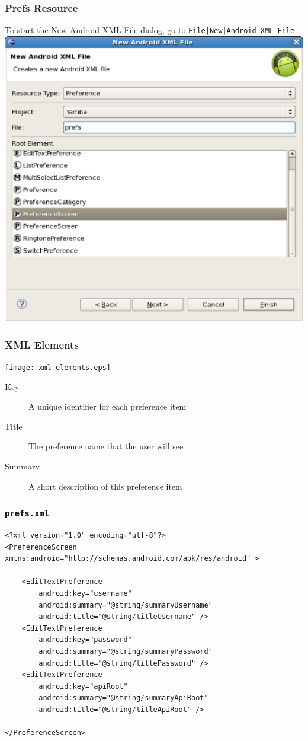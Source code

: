\begin{frame}
\frametitle{Prefs Resource}
To start the New Android XML File dialog, go to \texttt{File|New|Android XML File}
\centering
\includegraphics[width= 0.55 \textwidth]{newAndroidXMLFile.eps}
\end{frame}
\begin{frame}
\frametitle{XML Elements}

	\texttt{[image: xml-elements.eps]}

\begin{description}
	\item[Key] A unique identifier for each preference item
	\item[Title] The preference name that the user will see
	\item[Summary] A short description of this preference item
\end{description}
	
\end{frame}
\begin{frame}[containsverbatim]
\frametitle{\texttt{prefs.xml}}
\lstset{language=XML, style=eclipse}
\begin{adjustbox}{width=1.0 \textwidth}
\begin{lstlisting}[caption=res/xml/prefs.xml, basicstyle=\scriptsize,escapechar=$]
<?xml version="1.0" encoding="utf-8"?>
<PreferenceScreen xmlns:android="http://schemas.android.com/apk/res/android" >

    <EditTextPreference
        android:key="username"
        android:summary="@string/summaryUsername"
        android:title="@string/titleUsername" />
    <EditTextPreference
        android:key="password"
        android:summary="@string/summaryPassword"
        android:title="@string/titlePassword" />
    <EditTextPreference
        android:key="apiRoot"
        android:summary="@string/summaryApiRoot"
        android:title="@string/titleApiRoot" />

</PreferenceScreen>
\end{lstlisting}
\end{adjustbox}
\end{frame}
